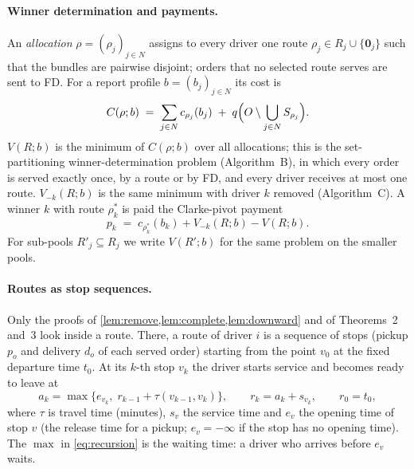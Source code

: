 \documentclass[11pt]{article}
\theoremstyle{definition}
\theoremstyle{remark}
\newcommand{\idle}{\mathbf{0}}
\begin{document}
\paragraph{Winner determination and payments.}
An \emph{allocation} $\rho=(\rho_j)_{j\in N}$ assigns to every driver one route
$\rho_j\in R_j\cup\{\idle_j\}$ such that the bundles are pairwise disjoint;
orders that no selected route serves are sent to FD. For a report profile
$b=(b_j)_{j\in N}$ its cost is
\begin{equation}\label{eq:alloccost}
C(\rho;b)\;=\;\sum_{j\in N}c_{\rho_j}(b_j)\;+\;q\Bigl(O\setminus\bigcup_{j\in N}S_{\rho_j}\Bigr).
\end{equation}
$V(R;b)$ is the minimum of $C(\rho;b)$ over all allocations; this is the
set-partitioning winner-determination problem (Algorithm~B), in which every
order is served exactly once, by a route or by FD, and every driver receives at
most one route. $V_{-k}(R;b)$ is the same minimum with driver $k$ removed
(Algorithm~C). A winner $k$ with route $\rho^*_k$ is paid the Clarke-pivot
payment
\begin{equation}\label{eq:payment}
p_k\;=\;c_{\rho^*_k}(b_k)+V_{-k}(R;b)-V(R;b).
\end{equation}
For sub-pools $R'_j\subseteq R_j$ we write $V(R';b)$ for the same problem on
the smaller pools.

\paragraph{Routes as stop sequences.}
Only the proofs of \cref{lem:remove,lem:complete,lem:downward} and of
Theorems~2 and~3 look inside a route. There, a route of driver $i$ is a
sequence of stops (pickup $p_o$ and delivery $d_o$ of each served order)
starting from the point $v_0$ at the fixed departure time $t_0$. At its
$k$-th stop $v_k$ the driver starts service and becomes ready to leave at
\begin{equation}\label{eq:recursion}
a_k=\max\bigl\{e_{v_k},\;r_{k-1}+\tau(v_{k-1},v_k)\bigr\},\qquad
r_k=a_k+s_{v_k},\qquad r_0=t_0,
\end{equation}
where $\tau$ is travel time (minutes), $s_v$ the service time and $e_v$ the
opening time of stop $v$ (the release time for a pickup; $e_v=-\infty$ if the
stop has no opening time). The $\max$ in \eqref{eq:recursion} is the waiting
time: a driver who arrives before $e_v$ waits.
\end{document}
